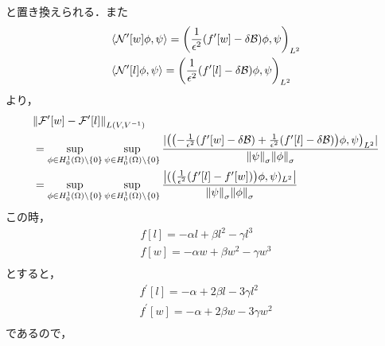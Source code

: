 と置き換えられる．また
\begin{align}
  &\langle \mathcal{N}'\qty[w]\phi,\psi \rangle =\qty(\frac{1}{\epsilon^2}\qty(f^\prime[w]-\delta \mathcal{B})\phi,\psi)_{L^2}\\
  &\langle \mathcal{N}'\qty[l]\phi,\psi \rangle =\qty(\frac{1}{\epsilon^2}\qty(f^\prime[l]-\delta \mathcal{B})\phi,\psi)_{L^2} 
\end{align}
より，
\begin{align}
  &\norm{\mathcal{F}'\qty[w]-\mathcal{F}'\qty[l]}_{L\qty(V,V^{-1})}\\
  &=
  \sup\limits_{\phi \in H^1_0(\Omega) \backslash \{ 0 \} }
  \sup\limits_{\psi \in H^1_0(\Omega) \backslash \{ 0 \} }
  \frac
  {|\qty(\qty(-\frac{1}{\epsilon^2}\qty(f^\prime[w]-\delta \mathcal{B}) 
  + \frac{1}{\epsilon^2}\qty(f^\prime[l]-\delta \mathcal{B}))\phi,\psi)_{L^2} |}
  {\norm{\psi}_\sigma\norm{\phi}_\sigma}\\
  &=
  \sup\limits_{\phi \in H^1_0(\Omega) \backslash \{ 0 \} }
  \sup\limits_{\psi \in H^1_0(\Omega) \backslash \{ 0 \} }
  \frac
  {\qty| (\qty(\frac{1}{\epsilon^2}\qty(f^\prime[l]-f^\prime[w]))\phi,\psi )_{L^2}|}
  {\norm{\psi}_\sigma\norm{\phi}_\sigma}\\
\end{align}
この時，
\begin{align}
  f[l]=-\alpha l + \beta l^2 - \gamma l^3\\
  f[w]=-\alpha w + \beta w^2 - \gamma w^3\\
\end{align}
とすると，
\begin{align}
  f^\prime[l]=-\alpha  + 2\beta l - 3\gamma l^2\\
  f^\prime[w]=-\alpha  + 2\beta w - 3\gamma w^2\\
\end{align}
であるので，
